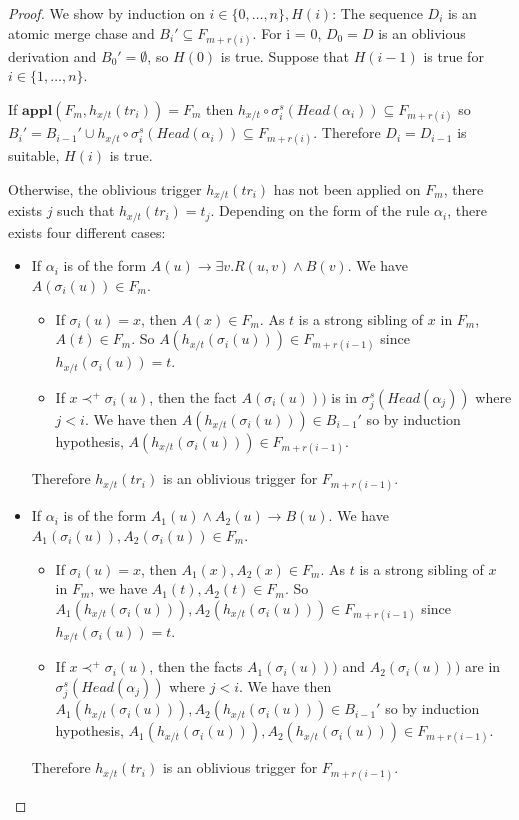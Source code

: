 \documentclass{article}
\theoremstyle{definition}
\theoremstyle{remark}
\newcommand{\Appl}{\textbf{appl}}
\begin{document}
\begin{proof}
We show by induction on $i \in \{0,\ldots, n\},H(i)$: The sequence $D_i$ is an atomic merge chase and $B_i' \subseteq F_{m+r(i)}$. For i = 0, $D_0 = D$ is an oblivious derivation and $B_0' = \emptyset$, so $H(0)$ is true. Suppose that $H(i-1)$ is true for $i \in \{1,\ldots,n\}$.

If $\Appl(F_{m},h_{x/t}(tr_{i})) = F_{m}$ then $h_{x/t} \circ \sigma_i^s(Head(\alpha_i)) \subseteq F_{m+r(i)}$ so $B_i' = B_{i-1}' \cup h_{x/t} \circ \sigma_i^s(Head(\alpha_i)) 	\subseteq F_{m+r(i)}$. Therefore $D_i = D_{i-1}$ is suitable, $H(i)$ is true.

Otherwise, the oblivious trigger $h_{x/t}(tr_{i})$ has not been applied on $F_{m}$, there exists $j$ such that $h_{x/t}(tr_{i}) = t_j$. Depending on the form of the rule $\alpha_i$, there exists four different cases:
	\begin{itemize}
	\item If $\alpha_i$ is of the form $A(u) \rightarrow \exists v.R(u,v) \wedge B(v)$. We have $A(\sigma_i(u)) \in F_m$.
		\begin{itemize}
		\item If $\sigma_i(u) = x$, then $A(x) \in F_m$. As $t$ is a strong sibling of $x$ in $F_m$, $A(t) \in F_m$. So $A(h_{x/t}(\sigma_i(u))) \in F_{m+r(i-1)}$ since $h_{x/t}(\sigma_i(u)) = t$.  
		\item If $x \prec^+ \sigma_i(u)$, then the fact $A(\sigma_i(u)))$ is in $\sigma_j^s(Head(\alpha_j))$ where $j<i$. We have then $A(h_{x/t}(\sigma_i(u)))\in B_{i-1}'$ so by induction hypothesis, $A(h_{x/t}(\sigma_i(u)))\in F_{m+r(i-1)}$. 
		\end{itemize}
Therefore $h_{x/t}(tr_{i})$ is an oblivious trigger for $F_{m+r(i-1)}$.

	\item If $\alpha_i$ is of the form $A_1(u) \wedge A_2(u) \rightarrow B(u)$. We have $A_1(\sigma_i(u)),A_2(\sigma_i(u)) \in F_m$.
		\begin{itemize}
		\item If $\sigma_i(u) = x$, then $A_1(x),A_2(x) \in F_m$. As $t$ is a strong sibling of $x$ in $F_m$, we have $A_1(t),A_2(t) \in F_m$. So $A_1(h_{x/t}(\sigma_i(u))),A_2(h_{x/t}(\sigma_i(u))) \in F_{m+r(i-1)}$ since $h_{x/t}(\sigma_i(u)) = t$.  
		\item If $x \prec^+ \sigma_i(u)$, then the facts $A_1(\sigma_i(u)))$ and $A_2(\sigma_i(u)))$ are in $\sigma_j^s(Head(\alpha_j))$ where $j<i$. We have then $A_1(h_{x/t}(\sigma_i(u))),A_2(h_{x/t}(\sigma_i(u)))\in B_{i-1}'$ so by induction hypothesis, $A_1(h_{x/t}(\sigma_i(u))),A_2(h_{x/t}(\sigma_i(u)))\in F_{m+r(i-1)}$. 
		\end{itemize}
Therefore $h_{x/t}(tr_{i})$ is an oblivious trigger for $F_{m+r(i-1)}$.  


\end{itemize}
\end{proof}
\end{document}
